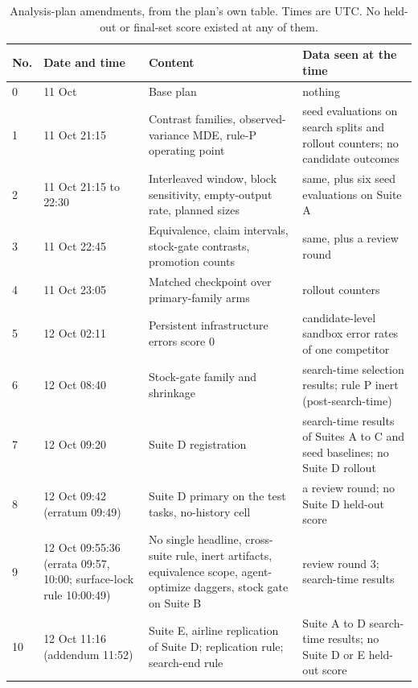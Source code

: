 \begin{table}[h]
\caption{Analysis-plan amendments, from the plan's own table. Times are UTC. No held-out or final-set score existed at any of them.}
\label{tab:amendments}
\centering\small
\begin{tabularx}{\textwidth}{@{}l l X X@{}}
\toprule
No. & Date and time & Content & Data seen at the time \\
\midrule
0 & 11 Oct & Base plan & nothing \\
1 & 11 Oct 21:15 & Contrast families, observed-variance MDE, rule-P operating point & seed evaluations on search splits and rollout counters; no candidate outcomes \\
2 & 11 Oct 21:15 to 22:30 & Interleaved window, block sensitivity, empty-output rate, planned sizes & same, plus six seed evaluations on Suite A \\
3 & 11 Oct 22:45 & Equivalence, claim intervals, stock-gate contrasts, promotion counts & same, plus a review round \\
4 & 11 Oct 23:05 & Matched checkpoint over primary-family arms & rollout counters \\
5 & 12 Oct 02:11 & Persistent infrastructure errors score 0 & candidate-level sandbox error rates of one competitor \\
6 & 12 Oct 08:40 & Stock-gate family and shrinkage & search-time selection results; rule P inert (post-search-time) \\
7 & 12 Oct 09:20 & Suite D registration & search-time results of Suites A to C and seed baselines; no Suite D rollout \\
8 & 12 Oct 09:42 (erratum 09:49) & Suite D primary on the test tasks, no-history cell & a review round; no Suite D held-out score \\
9 & 12 Oct 09:55:36 (errata 09:57, 10:00; surface-lock rule 10:00:49) & No single headline, cross-suite rule, inert artifacts, equivalence scope, agent-optimize daggers, stock gate on Suite B & review round 3; search-time results \\
10 & 12 Oct 11:16 (addendum 11:52) & Suite E, airline replication of Suite D; replication rule; search-end rule & Suite A to D search-time results; no Suite D or E held-out score \\
\bottomrule
\end{tabularx}
\end{table}
